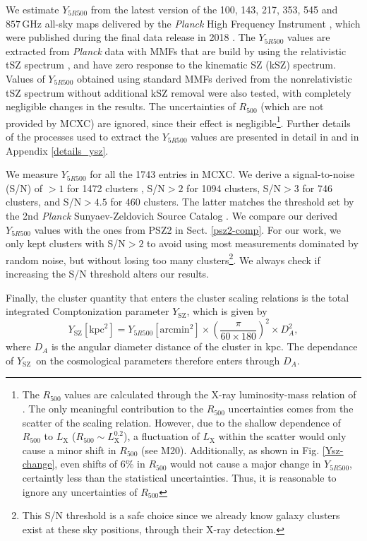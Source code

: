 \documentclass{aa}   %
\newcommand{\Ysz}{$Y_{\text{SZ}}$}
\begin{document}
We estimate $Y_{5R500}$ from the latest version of the 100, 143, 217, 353, 545 and $857 \, \mathrm{GHz}$ all-sky maps delivered by the \textit{Planck} High Frequency Instrument \citep[HFI; ][]{Planck_HFI}, which were published during the final data release in 2018 \citep[R3.00;][]{Planck_overview}. The $Y_{5R500}$ values are extracted from \textit{Planck} data with MMFs that are build by using the relativistic tSZ spectrum \citep[e.g.,][]{Wright79, Itoh98, Chluba12}, and have zero response to the kinematic SZ (kSZ) spectrum. Values of $Y_{5R500}$ obtained using standard MMFs derived from the nonrelativistic tSZ spectrum without additional kSZ removal were also tested, with completely negligible changes in the results. The uncertainties of $R_{500}$ (which are not provided by MCXC) are ignored, since their effect is negligible\footnote{The $R_{500}$ values are calculated through the X-ray luminosity-mass relation of \citet{arnaud2}. The only meaningful contribution to the $R_{500}$ uncertainties comes from the scatter of the scaling relation. However, due to the shallow dependence of $R_{500}$ to $L_{\text{X}}$ ($R_{500}\sim L_{\text{X}}^{0.2}$), a fluctuation of $L_{\text{X}}$ within the scatter would only cause a minor shift in $R_{500}$ (see M20). Additionally, as shown in Fig. \ref{Ysz-change}, even shifts of 6\% in $R_{500}$ would not cause a major change in $Y_{5R500}$, certaintly less than the statistical uncertainties. Thus, it is reasonable to ignore any uncertainties of $R_{500}$}. Further details of the processes used to extract the $Y_{5R500}$ values are presented in detail in \citet[][E19 hereafter]{erler} and in Appendix \ref{details_ysz}.

We measure $Y_{5R500}$ for all the 1743 entries in MCXC. We derive a signal-to-noise (S/N) of $>1$ for 1472 clusters , S/N$>2$ for 1094 clusters, S/N$>3$ for 746 clusters, and S/N$>4.5$ for 460 clusters. The latter matches the threshold set by the 2nd \textit{Planck} Sunyaev-Zeldovich Source Catalog \citep[PSZ2, ][hereafter A16]{ade-c}. We compare our derived $Y_{5R500}$ values with the ones from PSZ2 in Sect. \ref{psz2-comp}. For our work, we only kept clusters with S/N$>2$ to avoid using most measurements dominated by random noise, but without losing too many clusters\footnote{This S/N threshold is a safe choice since we already know galaxy clusters exist at these sky positions, through their X-ray detection.}. We always check if increasing the S/N threshold alters our results.

Finally, the cluster quantity that enters the cluster scaling relations is the total integrated Comptonization parameter \Ysz, which is given by
\begin{equation}
Y_{\text{SZ}}\left[\text{kpc}^2\right]=Y_{5R500}\left[\text{arcmin}^2\right]\times \left(\frac{\pi}{60\times 180}\right)^2 \times D_A^2,
\label{Ysz}
\end{equation}
where $D_A$ is the angular diameter distance of the cluster in kpc. The dependance of \Ysz\ on the cosmological parameters therefore enters through $D_A$.
\end{document}
